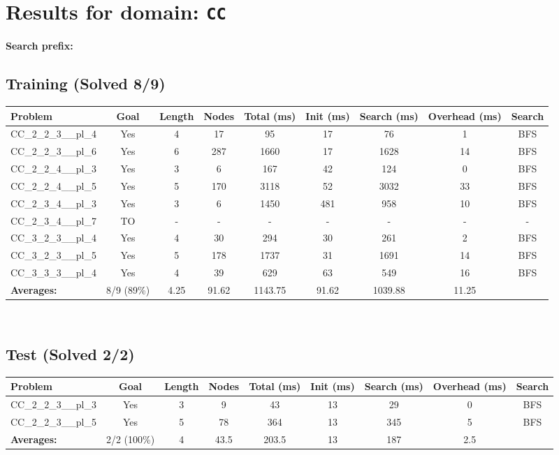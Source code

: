 \documentclass{article}
\begin{document}
\section*{Results for domain: \texttt{CC}}
\textbf{Search prefix:} 
\\[0.5cm]
\subsection*{Training (Solved 8/9)}
\begin{tabular}{lcccccccc}
\toprule
Problem & Goal & Length & Nodes & Total (ms) & Init (ms) & Search (ms) & Overhead (ms) & Search \\
\midrule
CC\_2\_2\_3\_\_pl\_4 & Yes & 4 & 17 & 95 & 17 & 76 & 1 & BFS \\
CC\_2\_2\_3\_\_pl\_6 & Yes & 6 & 287 & 1660 & 17 & 1628 & 14 & BFS \\
CC\_2\_2\_4\_\_pl\_3 & Yes & 3 & 6 & 167 & 42 & 124 & 0 & BFS \\
CC\_2\_2\_4\_\_pl\_5 & Yes & 5 & 170 & 3118 & 52 & 3032 & 33 & BFS \\
CC\_2\_3\_4\_\_pl\_3 & Yes & 3 & 6 & 1450 & 481 & 958 & 10 & BFS \\
CC\_2\_3\_4\_\_pl\_7 & TO & - & - & - & - & - & - & - \\
CC\_3\_2\_3\_\_pl\_4 & Yes & 4 & 30 & 294 & 30 & 261 & 2 & BFS \\
CC\_3\_2\_3\_\_pl\_5 & Yes & 5 & 178 & 1737 & 31 & 1691 & 14 & BFS \\
CC\_3\_3\_3\_\_pl\_4 & Yes & 4 & 39 & 629 & 63 & 549 & 16 & BFS \\
\textbf{Averages:} & 8/9 (89\%) & 4.25 & 91.62 & 1143.75 & 91.62 & 1039.88 & 11.25 & \\
\bottomrule
\end{tabular}
\\[0.7cm]
\subsection*{Test (Solved 2/2)}
\begin{tabular}{lcccccccc}
\toprule
Problem & Goal & Length & Nodes & Total (ms) & Init (ms) & Search (ms) & Overhead (ms) & Search \\
\midrule
CC\_2\_2\_3\_\_pl\_3 & Yes & 3 & 9 & 43 & 13 & 29 & 0 & BFS \\
CC\_2\_2\_3\_\_pl\_5 & Yes & 5 & 78 & 364 & 13 & 345 & 5 & BFS \\
\textbf{Averages:} & 2/2 (100\%) & 4 & 43.5 & 203.5 & 13 & 187 & 2.5 & \\
\bottomrule
\end{tabular}
\\[0.7cm]
\end{document}

